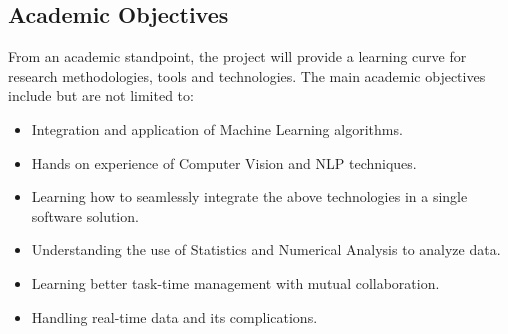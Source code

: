 \subsection{Academic Objectives}
From an academic standpoint, the project will provide a learning curve for research methodologies, tools and technologies. The main academic objectives include but are not limited to: 
\begin{itemize}
    \item Integration and application of Machine Learning algorithms.
    \item Hands on experience of Computer Vision and NLP techniques.
    \item Learning how to seamlessly integrate the above technologies in a single software solution.
    \item Understanding the use of Statistics and Numerical Analysis to analyze data.
    \item Learning better task-time management with mutual collaboration.
    \item Handling real-time data and its complications.
\end{itemize}
